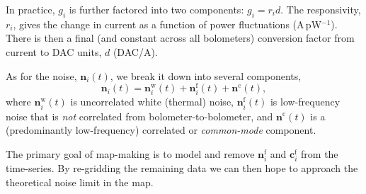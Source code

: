 \documentclass[useAMS,usenatbib,nofootinbib]{mn2e}
\begin{document}
In practice, $g_i$ is further factored into two components: $g_i = r_i
d$. The responsivity, $r_i$, gives the change in current as a function
of power fluctuations (A\,pW$^{-1}$). There is then a final (and
constant across all bolometers) conversion factor from current to DAC
units, $d$ (DAC/A).

As for the noise, $\mathbf{n}_i(t)$, we break it down into several
components,
%
\begin{equation}
  \mathbf{n}_i(t) = \mathbf{n}^\mathrm{w}_i(t) + \mathbf{n}^\mathrm{f}_i(t) +
  \mathbf{n}^\mathrm{c}(t),
\end{equation}
%
where $\mathbf{n}^\mathrm{w}_i(t)$ is uncorrelated white (thermal)
noise, $\mathbf{n}^\mathrm{f}_i(t)$ is low-frequency noise that is
\emph{not} correlated from bolometer-to-bolometer, and
$\mathbf{n}^\mathrm{c}(t)$ is a (predominantly low-frequency)
correlated or \emph{common-mode} component.

The primary goal of map-making is to model and remove
$\mathbf{n}^\mathrm{f}_i$ and $\mathbf{c}^\mathrm{f}_i$ from the
time-series. By re-gridding the remaining data we can then hope to
approach the theoretical noise limit in the map.
\end{document}
